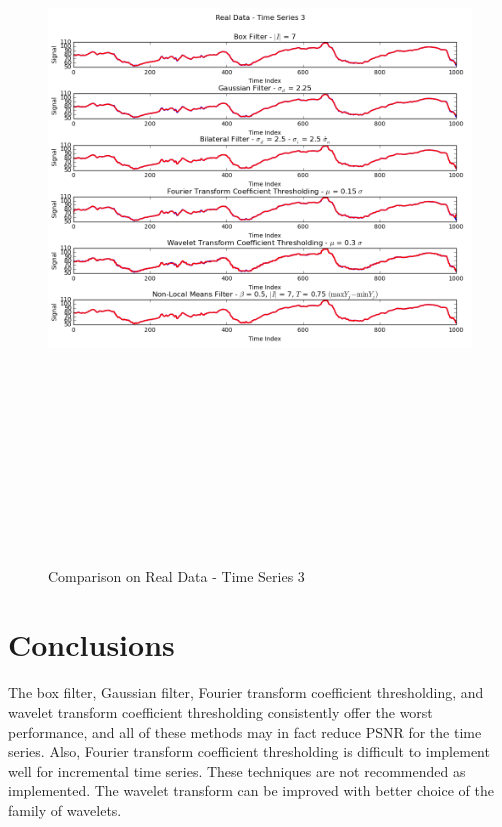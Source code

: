 \documentclass[11pt]{article}
\theoremstyle{definition}
\begin{document}
\begin{figure}[h!]
\centering
\includegraphics[width = 0.95 \textwidth,height = 8in]{TimeSeries3RealCompare.png}
\caption{Comparison on Real Data - Time Series 3}
\label{timeseries3realcompare}
\end{figure}

\section{Conclusions} \label{conclusion}

The box filter, Gaussian filter, Fourier transform coefficient
thresholding, and wavelet transform coefficient thresholding
consistently offer the worst performance, and all of these methods may
in fact reduce PSNR for the time series. Also, Fourier transform
coefficient thresholding is difficult to implement well for
incremental time series. These techniques are not recommended as
implemented. The wavelet transform can be improved with better choice
of the family of wavelets.
\end{document}
